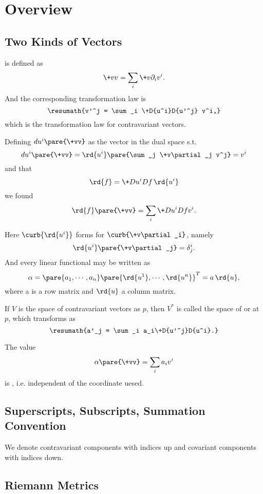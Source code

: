 \documentclass[hidelinks]{article}
\let\oldgloss\gloss
\def\gloss#1{\textbf{\oldgloss{#1}}}
\begin{document}
\section{Overview} %
\label{sec:overview}

\subsection{Two Kinds of Vectors} %
\label{sub:two_kinds_of_vectors}

 is defined as
\[ \+vv = \sum_i \+v\partial_i v^i. \]
And the corresponding transformation law is
\[ \resumath{v'^j = \sum_i \+D{u^i}D{u'^j} v^i,} \]
which is the transformation law for contravariant vectors.
\par
Defining $du^i\pare{\+vv}$ as the vector in the dual space s.t.
\[ du^i\pare{\+vv} = \rd{u^i}\pare{\sum_j \+v\partial_j v^j} = v^i \]
and that
\[ \rd{f} = \+D{u^i}D{f}\,\rd{u^i} \]
we found
\[ \rd{f}\pare{\+vv} = \sum_i \+D{u^i}Df v^i. \]
\par
Here $\curb{\rd{u^i}}$ forms  for $\curb{\+v\partial_i}$, namely
\[ \rd{u^i}\pare{\+v\partial_j} = \delta^i_j. \]
And every linear functional may be written as
\[ \alpha = \pare{a_1,\cdots,a_n}\pare{\rd{u^1},\cdots,\rd{u^n}}^T = a\,\rd{u}, \]
where a is a row matrix and $\rd{u}$ a column matrix.
\par
If $V$ is the space of contravariant vectors as $p$, then $V^*$ is called the space of  or  at $p$, which transforms as
\[ \resumath{a'_j = \sum_i a_i\+D{u'^j}D{u^i}.} \]
\par
The value
\[ \alpha\pare{\+vv} = \sum_i a_i v^i \]
is , i.e. independent of the coordinate uesed.


\subsection{Superscripts, Subscripts, Summation Convention} %
\label{sub:superscripts_subscripts_summation_convention}

We denote contravariant components with indices up and covariant components with indices down.


\subsection{Riemann Metrics} %
\label{sub:riemann_metrics}
\end{document}
